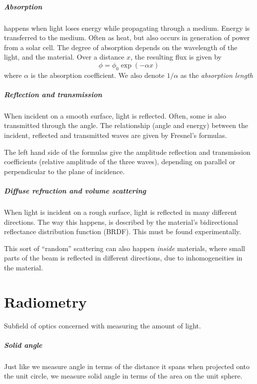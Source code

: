 \documentclass[article]{memoir}
\begin{document}
\paragraph{Absorption}
happens when light loses energy while propagating through a medium. Energy is transferred to the medium. Often as heat, but also occurs in generation of power from a solar cell. The degree of absorption depends on the wavelength of the light, and the material. Over a distance \(x\), the resulting flux is given by
\[
    \phi = \phi_0 \exp{(- \alpha x)}
\]
where \(\alpha\) is the absorption coefficient. We also denote \(1/\alpha\) as the \emph{absorption length}

\paragraph{Reflection and transmission}
When incident on a smooth surface, light is reflected. Often, some is also transmitted through the angle. The relationship (angle and energy) between the incident, reflected and transmitted waves  are given by Fresnel's formulas.

The left hand side of the formulas give the amplitude reflection and transmission coefficients (relative amplitude of the three waves), depending on parallel or perpendicular to the plane of incidence.

\paragraph{Diffuse refraction and volume scattering}
When light is incident on a rough surface, light is reflected in many different directions. The way this happens, is described by the material's bidirectional reflectance distribution function (BRDF). This must be found experimentally.

This sort of ``random'' scattering can also happen \emph{inside} materials, where small parts of the beam is reflected in different directions, due to inhomogeneities in the material.

\chapter{Radiometry}
Subfield of optics concerned with measuring the amount of light.

\paragraph{Solid angle} Just like we measure angle in terms of the distance it spans when projected onto the unit circle, we measure solid angle in terms of the area on the unit sphere.
\end{document}
